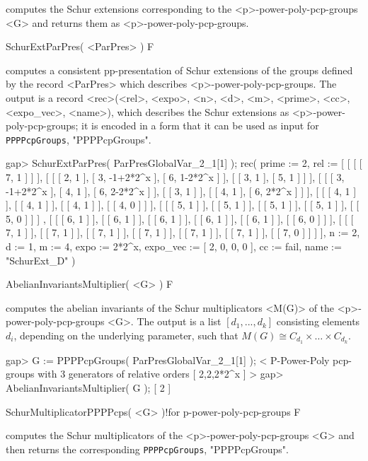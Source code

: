 computes the Schur extensions corresponding to the <p>-power-poly-pcp-groups
<G> and returns them as <p>-power-poly-pcp-groups.

\>SchurExtParPres( <ParPres> ) F

computes a consistent pp-presentation of Schur extensions of the 
groups defined by the record <ParPres> which describes 
<p>-power-poly-pcp-groups. The output is a record 
<rec>(<rel>, <expo>, <n>, <d>, <m>, <prime>, <cc>, <expo\_vec>, <name>), 
which describes the Schur extensions as <p>-power-poly-pcp-groups; it is 
encoded in a form that it can be used as input for 
{\tt PPPPcpGroups},
"PPPPcpGroups".

\beginexample
gap> SchurExtParPres( ParPresGlobalVar_2_1[1] );
rec( prime := 2, 
  rel := [ [ [ [ 7, 1 ] ] ], [ [ [ 2, 1 ], [ 3, -1+2*2^x ], [ 6, 1-2*2^x ] ], 
          [ [ 3, 1 ], [ 5, 1 ] ] ], 
      [ [ [ 3, -1+2*2^x ], [ 4, 1 ], [ 6, 2-2*2^x ] ], [ [ 3, 1 ] ], 
          [ [ 4, 1 ], [ 6, 2*2^x ] ] ], 
      [ [ [ 4, 1 ] ], [ [ 4, 1 ] ], [ [ 4, 1 ] ], [ [ 4, 0 ] ] ], 
      [ [ [ 5, 1 ] ], [ [ 5, 1 ] ], [ [ 5, 1 ] ], [ [ 5, 1 ] ], [ [ 5, 0 ] ] ]
        , 
      [ [ [ 6, 1 ] ], [ [ 6, 1 ] ], [ [ 6, 1 ] ], [ [ 6, 1 ] ], [ [ 6, 1 ] ], 
          [ [ 6, 0 ] ] ], 
      [ [ [ 7, 1 ] ], [ [ 7, 1 ] ], [ [ 7, 1 ] ], [ [ 7, 1 ] ], [ [ 7, 1 ] ], 
          [ [ 7, 1 ] ], [ [ 7, 0 ] ] ] ], n := 2, d := 1, m := 4, 
  expo := 2*2^x, expo_vec := [ 2, 0, 0, 0 ], cc := fail, name := "SchurExt_D" 
 )
\endexample


\>AbelianInvariantsMultiplier( <G> ) F

computes the abelian invariants of the Schur multiplicators <M(G)> of the
<p>-power-poly-pcp-groups <G>. The output is a list $[d_1, ..., d_k]$
consisting elements $d_i$, depending on the underlying parameter, such that 
$M(G) \cong C_{d_1} \times \ldots \times C_{d_k}$.

\beginexample
gap> G := PPPPcpGroups( ParPresGlobalVar_2_1[1] );
< P-Power-Poly pcp-groups with 3 generators of relative orders [ 2,2,2*2^x ] >
gap> AbelianInvariantsMultiplier( G );
[ 2 ]
\endexample

\>SchurMultiplicatorPPPPcps( <G> )!{for p-power-poly-pcp-groups} F

computes the Schur multiplicators of the <p>-power-poly-pcp-groups <G> and 
then returns the corresponding 
{\tt PPPPcpGroups},
"PPPPcpGroups".

